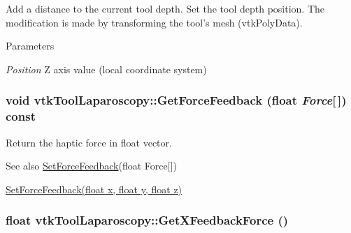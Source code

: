 Add a distance to the current tool depth. Set the tool depth position. The modification is made by transforming the tool's mesh (vtkPolyData). 
\begin{DoxyParams}{Parameters}
\item[{\em Position}]Z axis value (local coordinate system) \end{DoxyParams}
\hypertarget{classvtkToolLaparoscopy_abc10b86fce49b9260bb3d43e6a3a0166}{
\subsubsection[{GetForceFeedback}]{\setlength{\rightskip}{0pt plus 5cm}void vtkToolLaparoscopy::GetForceFeedback (float {\em Force}\mbox{[}$\,$\mbox{]}) const}}
\label{classvtkToolLaparoscopy_abc10b86fce49b9260bb3d43e6a3a0166}


Return the haptic force in float vector. \begin{DoxySeeAlso}{See also}
\hyperlink{classvtkToolLaparoscopy_a9bbfa040ca224472e6c669a3c27d9977}{SetForceFeedback}(float Force\mbox{[}\mbox{]}) 

\hyperlink{classvtkToolLaparoscopy_aa716d470104640646068eaa160a7adf2}{SetForceFeedback(float x, float y, float z)} 
\end{DoxySeeAlso}
\hypertarget{classvtkToolLaparoscopy_aa891d5e424ce8c57a49b0631dfdfaa93}{
\subsubsection[{GetXFeedbackForce}]{\setlength{\rightskip}{0pt plus 5cm}float vtkToolLaparoscopy::GetXFeedbackForce ()}}
\label{classvtkToolLaparoscopy_aa891d5e424ce8c57a49b0631dfdfaa93}


